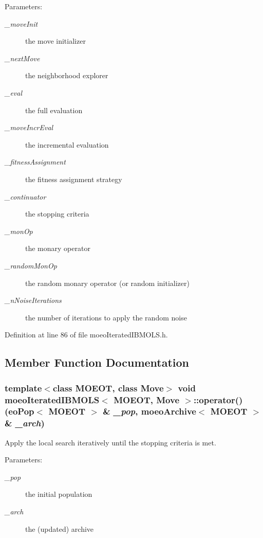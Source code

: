 \begin{Desc}
\item[Parameters:]
\begin{description}
\item[{\em \_\-move\-Init}]the move initializer \item[{\em \_\-next\-Move}]the neighborhood explorer \item[{\em \_\-eval}]the full evaluation \item[{\em \_\-move\-Incr\-Eval}]the incremental evaluation \item[{\em \_\-fitness\-Assignment}]the fitness assignment strategy \item[{\em \_\-continuator}]the stopping criteria \item[{\em \_\-mon\-Op}]the monary operator \item[{\em \_\-random\-Mon\-Op}]the random monary operator (or random initializer) \item[{\em \_\-n\-Noise\-Iterations}]the number of iterations to apply the random noise \end{description}
\end{Desc}


Definition at line 86 of file moeo\-Iterated\-IBMOLS.h.

\subsection{Member Function Documentation}
\subsubsection{\setlength{\rightskip}{0pt plus 5cm}template$<$class MOEOT, class Move$>$ void \bf{moeo\-Iterated\-IBMOLS}$<$ MOEOT, Move $>$::operator() (\bf{eo\-Pop}$<$ MOEOT $>$ \& {\em \_\-pop}, \bf{moeo\-Archive}$<$ MOEOT $>$ \& {\em \_\-arch})\hspace{0.3cm}{\tt  [inline, virtual]}}\label{classmoeoIteratedIBMOLS_52d4aa19a93c69ed0c2246c62821e76e}


Apply the local search iteratively until the stopping criteria is met. 

\begin{Desc}
\item[Parameters:]
\begin{description}
\item[{\em \_\-pop}]the initial population \item[{\em \_\-arch}]the (updated) archive \end{description}
\end{Desc}


